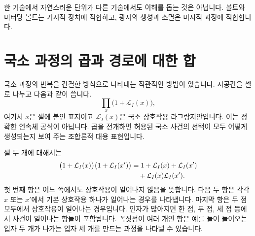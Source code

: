 \begin{classroomqa}
\end{classroomqa}

한 기술에서 자연스러운 단위가 다른 기술에서도 이해를 돕는 것은 아닙니다. 볼트와 미터당 볼트는 거시적 장치에 적합하고, 광자의 생성과 소멸은 미시적 과정에 적합합니다.

\begin{classroomqa}
\end{classroomqa}

\section{국소 과정의 곱과 경로에 대한 합}

국소 과정의 반복을 간결한 방식으로 나타내는 직관적인 방법이 있습니다. 시공간을 셀로 나누고 다음과 같이 씁니다.
\begin{equation}
\prod_x\bigl(1+\mathcal L_I(x)\bigr),
\end{equation}
여기서 \(x\)은 셀에 붙인 표지이고 \(\mathcal L_I(x)\)은 국소 상호작용 라그랑지안입니다. 이는 정확한 연속체 공식이 아닙니다. 곱을 전개하면 허용된 국소 사건의 선택이 모두 어떻게 생성되는지 보여 주는 조합론적 대용 표현입니다.

\begin{classroomqa}
\end{classroomqa}

셀 두 개에 대해서는
\begin{align}
\bigl(1+\mathcal L_I(x)\bigr)
\bigl(1+\mathcal L_I(x')\bigr)
&=
1+\mathcal L_I(x)+\mathcal L_I(x')
\notag\\
&\quad{}+\mathcal L_I(x)\mathcal L_I(x').
\end{align}
첫 번째 항은 어느 쪽에서도 상호작용이 일어나지 않음을 뜻합니다. 다음 두 항은 각각 \(x\) 또는 \(x'\)에서 기본 상호작용 하나가 일어나는 경우를 나타냅니다. 마지막 항은 두 점 모두에서 상호작용이 일어나는 경우입니다. 인자가 많아지면 한 점, 두 점, 세 점 등에서 사건이 일어나는 항들이 포함됩니다. 꼭짓점이 여러 개인 항은 예를 들어 들어오는 입자 두 개가 나가는 입자 세 개를 만드는 과정을 나타낼 수 있습니다.

